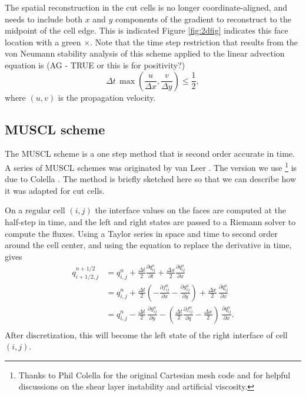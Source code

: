 The spatial reconstruction in the cut cells is no longer
coordinate-aligned, and needs 
to include both $x$ and $y$ components of the gradient to 
reconstruct to the midpoint of the cell edge. This is indicated 
Figure \ref{fig:2dfig}  indicates this face location with a green $\times$.
Note that the time step restriction that results from the von Neumann 
stability analysis of this scheme applied to the linear advection equation is  (AG -
TRUE or this is for positivity?)
\begin{equation}
\Delta t \,  \max\left(\frac{u}{\Delta x},\frac{v}{\Delta y}\right) \leq \frac{1}{2} ,
\end{equation}
where $(u,v)$ is the propagation velocity.  

\subsection{MUSCL scheme}
The MUSCL scheme is a one step method that is second order accurate in
time. A series of MUSCL schemes  was originated by van Leer 
\cite{vanleer:muscl}. The version we use
\footnote{Thanks to Phil 
Colella for the original Cartesian mesh code and for helpful discussions on the shear
layer instability and artificial viscosity.}
is due to Colella \cite{Colella:Unsplit}.
The method is briefly sketched here so that we can describe how it was
adapted for cut cells. 

On a regular cell $(i,j)$ the interface values on the 
faces are computed at the half-step in time, and the left and right states
are passed to a Riemann
solver to compute the fluxes.
Using a Taylor series in space and time to second order around the
cell center, and using the equation to replace the derivative in time,  gives
\begin{equation}\label{taylor}
\begin{split}
q_{i+1/2,j}^{n+1/2} & = q_{i,j}^n + 
              \frac{\Delta t}{2} \frac{\partial q_{ij}^n}{\partial t} + 
              \frac{\Delta x}{2} \frac{\partial q_{ij}^n}{\partial x} \\[.08in]
            &  = q_{i,j}^n + \frac{\Delta t}{2} 
            (-\frac{\partial f_{ij}^n}{\partial x} -
             \frac{\partial g_{ij}^n}{\partial y})  +
             \frac{\Delta x}{2} \, \frac{\partial q_{ij}^n}{\partial x} \\[.08in]
            &  = q_{i,j}^n - \frac{\Delta t}{2} \, 
             \frac{\partial g_{ij}^n}{\partial y}  -
            ( \frac{\Delta t}{2} 
            \frac{\partial f_{ij}^n}{\partial q} -
             \frac{\Delta x}{2} ) \,\frac{\partial q_{ij}^n}{\partial x} . \\[.08in]
\end{split}
\end{equation}
After discretization, this will become the left state of the right interface
of cell $(i,j)$.

